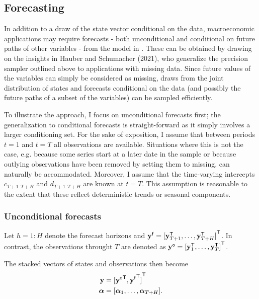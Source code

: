 \documentclass[notitlepage,a4paper,12pt]{article}
\newcommand{\transpose}[1]{{#1}^{\sf{T}}}
\begin{document}
\subsection{Forecasting}

In addition to a draw of the state vector conditional on the data, macroeconomic applications may require forecasts - both unconditional and conditional on future paths of other variables - from the model in . 
These can be obtained by drawing on the insights in Hauber and Schumacher (2021), who generalize the precision sampler outlined above to applications with missing data. Since future values of the variables can simply be considered as missing, draws from the joint distribution of states and forecasts conditional on the data (and possibly the future paths of a subset of the variables) can be sampled efficiently. 

To illustrate the approach, I focus on unconditional forecasts first; the generalization to conditional forecasts is straight-forward as it simply involves a larger conditioning set. For the sake of exposition, I assume that between periods $t=1$ and $t=T$ all observations are available. Situations where this is not the case, e.g. because some series start at a later date in the sample or because outlying observations have been removed by setting them to missing, can naturally be accommodated. Moreover, I assume that the time-varying intercepts $c_{T+1:T+H}$ and $d_{T+1:T+H}$ are known at $t=T$. This assumption is reasonable to the extent that these reflect deterministic trends or seasonal components. 

\subsubsection{Unconditional forecasts}\label{sec:uncondfcast}

Let $h = 1:H$ denote the forecast horizons and $\mathbf{y}^{\sf{f}} = \transpose{[\mathbf{y}^{\sf{T}}_{T+1}, \dots, \mathbf{y}^{\sf{T}}_{T+H}]}$. In contrast, the observations throught $T$ are denoted as $\mathbf{y}^{\sf{o}} = \transpose{[\mathbf{y}^{\sf{T}}_{1}, \dots, \mathbf{y}^{\sf{T}}_{T}]}$. 

The stacked vectors of states and observations then become
\begin{align*}
\mathbf{y} &= \transpose{[\transpose{\mathbf{y}^{\sf{o}}}, \transpose{\mathbf{y}^{\sf{f}}}]} \\
\boldsymbol{\alpha} &= [\boldsymbol{\alpha}_1, \dots, \boldsymbol{\alpha}_{T+H}].
\end{align*}
\end{document}
